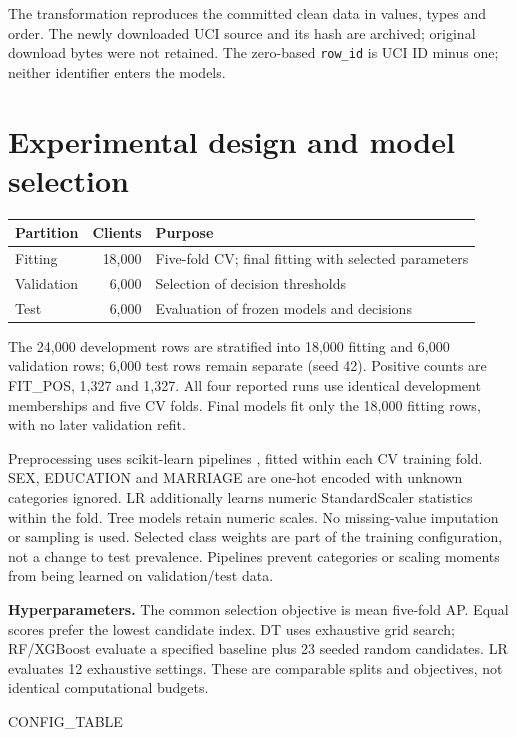 \documentclass{article}
\begin{document}
The transformation reproduces the committed clean data in values, types and order. The newly downloaded UCI source and its hash are archived; original download bytes were not retained. The zero-based \texttt{row\_id} is UCI ID minus one; neither identifier enters the models.
\newpage
\section{Experimental design and model selection}
\begin{center}
\begin{minipage}{\linewidth}
\label{tab:split}\centering
\begin{tabularx}{\linewidth}{@{}lrX@{}}\toprule
Partition & Clients & Purpose\\\midrule
Fitting & 18,000 & Five-fold CV; final fitting with selected parameters\\
Validation & 6,000 & Selection of decision thresholds\\
Test & 6,000 & Evaluation of frozen models and decisions\\\bottomrule
\end{tabularx}
\end{minipage}
\end{center}
The 24,000 development rows are stratified into 18,000 fitting and 6,000 validation rows; 6,000 test rows remain separate (seed 42). Positive counts are {{FIT_POS}}, 1,327 and 1,327. All four reported runs use identical development memberships and five CV folds. Final models fit only the 18,000 fitting rows, with no later validation refit.

Preprocessing uses scikit-learn pipelines \citep{sklearn}, fitted within each CV training fold. SEX, EDUCATION and MARRIAGE are one-hot encoded with unknown categories ignored. LR additionally learns numeric StandardScaler statistics within the fold. Tree models retain numeric scales. No missing-value imputation or sampling is used. Selected class weights are part of the training configuration, not a change to test prevalence. Pipelines prevent categories or scaling moments from being learned on validation/test data.

\textbf{Hyperparameters.} The common selection objective is mean five-fold AP. Equal scores prefer the lowest candidate index. DT uses exhaustive grid search; RF/XGBoost evaluate a specified baseline plus 23 seeded random candidates. LR evaluates 12 exhaustive settings. These are comparable splits and objectives, not identical computational budgets.
\begin{center}
\begin{minipage}{\linewidth}
\centering
{{CONFIG_TABLE}}
\end{minipage}
\end{center}
\end{document}
